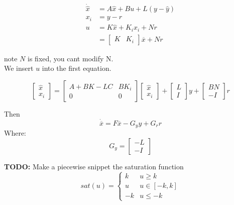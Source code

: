 \documentclass[a4paper]{article}
\begin{document}
\begin{align}
	\dot{\hat{x}} &= A \hat{x} + B u + L(y-\hat{y})  \\
	x_i &= y-r \\
	u &= K \hat{x} + K_i x_i + N r \\
	 &= \begin{bmatrix}
	K & K_i 
	\end{bmatrix} \overline{x} + N r
\end{align} 

note $ N $ is fixed, you cant modify N. \\
We insert $ u $ into the first equation.


\begin{equation}
\begin{bmatrix}
\hat{x} \\
x_i
\end{bmatrix} = \begin{bmatrix}
A + B K - L C & B K_i \\
0 & 0
\end{bmatrix} \begin{bmatrix}
\hat{x} \\
x_i
\end{bmatrix} + \begin{bmatrix}
L  \\
I
\end{bmatrix} y + \begin{bmatrix}
B N \\
- I
\end{bmatrix} r
\end{equation}

Then
\begin{equation}
	\dot{\overline{x}} = F \overline{x} - G_y y + G_r r
\end{equation}
Where:
\begin{equation}
G_y = \begin{bmatrix}
-L \\
-I
\end{bmatrix} 
\end{equation}


\textbf{TODO:} Make a piecewise snippet 
the saturation function
\begin{equation}\label{eq9}
	sat(u) = 
	\begin{cases}
		k & u \geq k \\
		u & u \in [-k, k] \\
		-k & u \leq - k
	\end{cases}
\end{equation}
\end{document}
